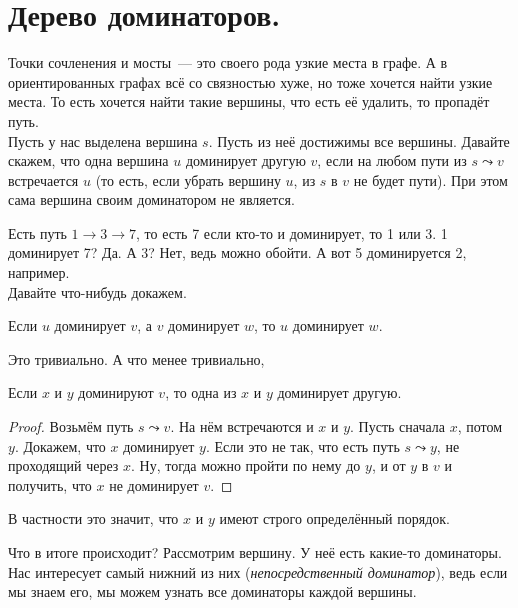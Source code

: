 \documentclass{article}
\begin{document}
    \section{Дерево доминаторов.}
    Точки сочленения и мосты~--- это своего рода узкие места в графе. А в ориентированных графах всё со связностью хуже, но тоже хочется найти узкие места. То есть хочется найти такие вершины, что есть её удалить, то пропадёт путь.\\
    Пусть у нас выделена вершина $s$. Пусть из неё достижимы все вершины. Давайте скажем, что одна вершина $u$ доминирует другую $v$, если на любом пути из $s\leadsto v$ встречается $u$ (то есть, если убрать вершину $u$, из $s$ в $v$ не будет пути). При этом сама вершина своим доминатором не является.
    \begin{figure}[H]
    \end{figure}\noindent
    Есть путь $1\to3\to7$, то есть 7 если кто-то и доминирует, то 1 или 3. 1 доминирует 7? Да. А 3? Нет, ведь можно обойти. А вот 5 доминируется 2, например.\\
    Давайте что-нибудь докажем.
    \begin{claim}
        Если $u$ доминирует $v$, а $v$ доминирует $w$, то $u$ доминирует $w$.
    \end{claim}\noindent
    Это тривиально. А что менее тривиально,
    \begin{claim}
        Если $x$ и $y$ доминируют $v$, то одна из $x$ и $y$ доминирует другую.
    \end{claim}
    \begin{proof}
        Возьмём путь $s\leadsto v$. На нём встречаются и $x$ и $y$. Пусть сначала $x$, потом $y$. Докажем, что $x$ доминирует $y$. Если это не так, что есть путь $s\leadsto y$, не проходящий через $x$. Ну, тогда можно пройти по нему до $y$, и от $y$ в $v$ и получить, что $x$ не доминирует $v$.
    \end{proof}
    \begin{corollary}
        В частности это значит, что $x$ и $y$ имеют строго определённый порядок.
    \end{corollary}\noindent
    Что в итоге происходит? Рассмотрим вершину. У неё есть какие-то доминаторы. Нас интересует самый нижний из них (\textit{непосредственный доминатор}), ведь если мы знаем его, мы можем узнать все доминаторы каждой вершины.
\end{document}
